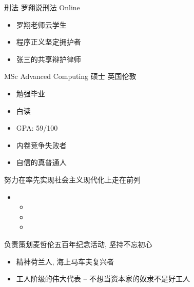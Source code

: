 

刑法 \quad 罗翔说刑法 \hfill Online

\begin{itemize}
  \item 罗翔老师云学生
  \item 程序正义坚定拥护者
  \item 张三的共享辩护律师
\end{itemize}


MSc Advanced Computing \quad 硕士 \hfill {英国伦敦}
\begin{itemize}
  \item 勉强毕业
  \item 白读
\end{itemize}




\begin{itemize}
  \item GPA: 59/100
  \item 内卷竞争失败者
  \item 自信的真普通人
\end{itemize}



努力在率先实现社会主义现代化上走在前列

\begin{itemize}
  \item 
  \begin{itemize}
      \item 
      \item 
      \item 
  \end{itemize}

\end{itemize}



负责策划麦哲伦五百年纪念活动, 坚持不忘初心
\begin{itemize}
  \item 精神荷兰人, 海上马车夫复兴者
  \item 工人阶级的伟大代表 -- 不想当资本家的奴隶不是好工人
\end{itemize}


